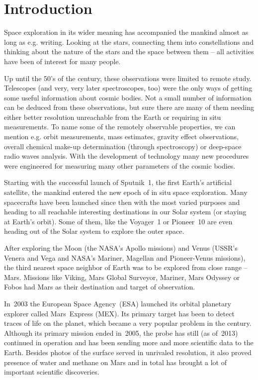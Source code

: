 \chapter*{Introduction}
Space exploration in its wider meaning has accompanied the mankind almost as long as e.g. writing. Looking at the stars, connecting them into constellations and thinking about the nature of the stars and the space between them -- all activities have been of interest for many people.

Up until the 50's of the  century, these observations were limited to remote study. Telescopes (and very, very later spectroscopes, too) were the only ways of getting some useful information about cosmic bodies. Not a small number of information can be deduced from these observations, but sure there are many of them needing either better resolution unreachable from the Earth or requiring in situ measurements. To name some of the remotely observable properties, we can mention e.g. orbit measurements, mass estimates, gravity effect observations, overall chemical make-up determination (through spectroscopy) or deep-space radio waves analysis. With the development of technology many new procedures were engineered for measuring many other parameters of the cosmic bodies.

Starting with the successful launch of Sputnik~1, the first Earth's artificial satellite, the mankind entered the new epoch of in situ space exploration. Many spacecrafts have been launched since then with the most varied purposes and heading to all reachable interesting destinations in our Solar system (or staying at Earth's orbit). Some of them, like the Voyager~1 or Pioneer~10 are even heading out of the Solar system to explore the outer space.

After exploring the Moon (the NASA's Apollo missions) and Venus (USSR's Venera and Vega and NASA's Mariner, Magellan and Pioneer-Venus missions), the third nearest space neighbor of Earth was to be explored from close range -- Mars. Missions like Viking, Mars Global Surveyor, Mariner, Mars Odyssey or Fobos had Mars as their destination and target of observation.

In~2003 the European Space Agency~(ESA) launched its orbital planetary explorer called Mars~Express (MEX). Its primary target has been to detect traces of life on the planet, which became a very popular problem in the  century. Although its primary mission ended in~2005, the probe has still (as of~2013) continued in operation and has been sending more and more scientific data to the Earth. Besides photos of the surface served in unrivaled resolution, it also proved presence of water and methane on Mars and in total has brought a lot of important scientific discoveries.

